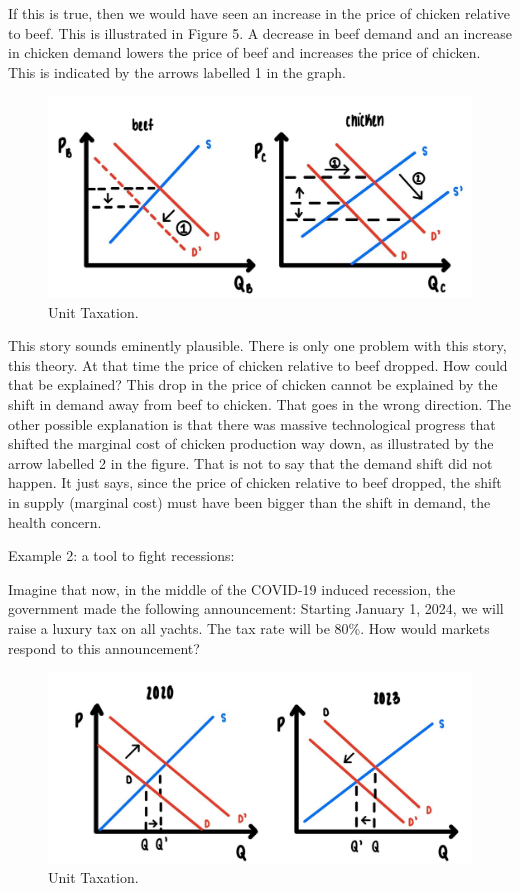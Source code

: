 \documentclass[
]{book}
\begin{document}
If this is true, then we would have seen an increase in the price of chicken relative to beef. This is illustrated in Figure 5. A decrease in beef demand and an increase in chicken demand lowers the price of beef and increases the price of chicken. This is indicated by the arrows labelled 1 in the graph.

\begin{figure}

{\centering \includegraphics[width=0.5\linewidth]{img/ch5/fig5} 

}

\caption{Unit Taxation.}\label{fig:fig505}
\end{figure}

This story sounds eminently plausible. There is only one problem with this story, this theory. At that time the price of chicken relative to beef dropped.
How could that be explained? This drop in the price of chicken cannot be explained by the shift in demand away from beef to chicken. That goes in the wrong direction. The other possible explanation is that there was massive technological progress that shifted the marginal cost of chicken production way down, as illustrated by the arrow labelled 2 in the figure.
That is not to say that the demand shift did not happen. It just says, since the price of chicken relative to beef dropped, the shift in supply (marginal cost) must have been bigger than the shift in demand, the health concern.

Example 2: a tool to fight recessions:

Imagine that now, in the middle of the COVID-19 induced recession, the government made the following announcement: Starting January 1, 2024, we will raise a luxury tax on all yachts. The tax rate will be 80\%. How would markets respond to this announcement?

\begin{figure}

{\centering \includegraphics[width=0.5\linewidth]{img/ch5/fig6} 

}

\caption{Unit Taxation.}\label{fig:fig506}
\end{figure}
\end{document}
